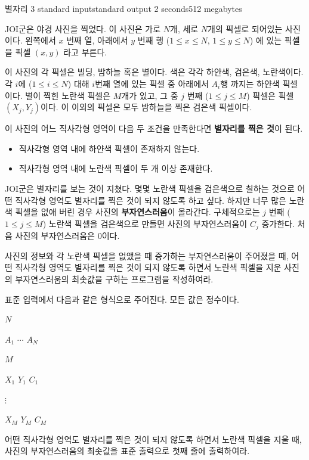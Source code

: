 \begin{problem}{별자리 3}
	{standard input}{standard output}
	{2 seconds}{512 megabytes}{}
	
	JOI군은 야경 사진을 찍었다. 이 사진은 가로 $N$개, 세로 $N$개의 픽셀로 되어있는 사진이다. 왼쪽에서 $x$ 번째 열, 아래에서 $y$ 번째 행 ($1 \le x \le N$, $1 \le y \le N$) 에 있는 픽셀을 픽셀 $(x, y)$ 라고 부른다.
	
	이 사진의 각 픽셀은 빌딩, 밤하늘 혹은 별이다. 색은 각각 하얀색, 검은색, 노란색이다. 각 $i$에 ($1 \le i \le N$) 대해 $i$번째 열에 있는 픽셀 중 아래에서 $A_i$행 까지는 하얀색 픽셀이다. 별이 찍힌 노란색 픽셀은 $M$개가 있고, 그 중 $j$ 번째 ($1 \le j \le M$) 픽셀은 픽셀 $(X_j, Y_j)$이다. 이 이외의 픽셀은 모두 밤하늘을 찍은 검은색 픽셀이다.
	
	이 사진의 어느 직사각형 영역이 다음 두 조건을 만족한다면 \textbf{별자리를 찍은 것}이 된다.
	
	\begin{itemize}
		\item 직사각형 영역 내에 하얀색 픽셀이 존재하지 않는다.
		\item 직사각형 영역 내에 노란색 픽셀이 두 개 이상 존재한다.
	\end{itemize}

	JOI군은 별자리를 보는 것이 지쳤다. 몇몇 노란색 픽셀을 검은색으로 칠하는 것으로 어떤 직사각형 영역도 별자리를 찍은 것이 되지 않도록 하고 싶다. 하지만 너무 많은 노란색 픽셀을 없애 버린 경우 사진의 \textbf{부자연스러움}이 올라간다. 구체적으로는 $j$ 번째 ($1 \le j \le M$) 노란색 픽셀을 검은색으로 만들면 사진의 부자연스러움이 $C_j$ 증가한다. 처음 사진의 부자연스러움은 0이다.
	
	사진의 정보와 각 노란색 픽셀을 없앴을 때 증가하는 부자연스러움이 주어졌을 때, 어떤 직사각형 영역도 별자리를 찍은 것이 되지 않도록 하면서 노란색 픽셀을 지운 사진의 부자연스러움의 최솟값을 구하는 프로그램을 작성하여라.
	
	
\InputFile

표준 입력에서 다음과 같은 형식으로 주어진다. 모든 값은 정수이다.

$N$ 

$A_1$ $\cdots$ $A_N$

$M$

$X_1$ $Y_1$ $C_1$

$\vdots$

$X_M$ $Y_M$ $C_M$

\OutputFile

어떤 직사각형 영역도 별자리를 찍은 것이 되지 않도록 하면서 노란색 픽셀을 지울 때, 사진의 부자연스러움의 최솟값을 표준 출력으로 첫째 줄에 출력하여라.


\end{problem}
